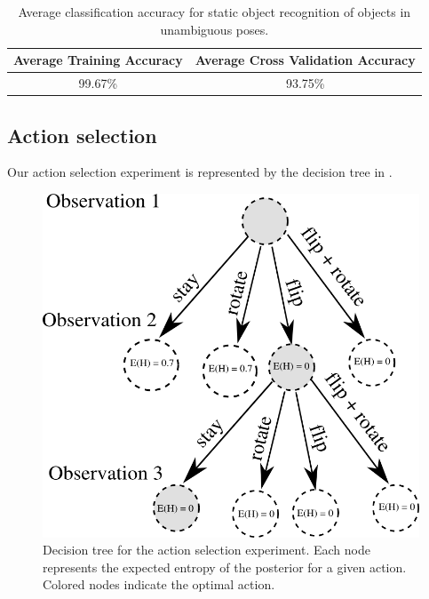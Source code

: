         \begin{table}[h]
                \centering
                \begin{tabular}{|c|c|}
                \hline
                Average Training Accuracy & Average Cross Validation Accuracy \\
                \hline
                99.67\% & 93.75\% \\
                \hline
                \end{tabular}
                \caption{Average classification accuracy for static object recognition of objects in unambiguous poses.}
                \label{tab:accuracy}
        \end{table}

    \subsection{Action selection}

        Our action selection experiment is represented by the decision tree in .

        \begin{figure}[h]
            \centering
            \includegraphics[scale=0.7]{pics/tree_small.png}
            \caption{Decision tree for the action selection experiment. Each node represents the expected entropy of the posterior for a given action. Colored nodes indicate the optimal action.}
            \label{fig:tree} %
        \end{figure}

